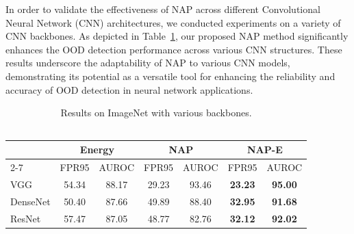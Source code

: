 In order to validate the effectiveness of NAP across different Convolutional Neural Network (CNN) architectures, we conducted experiments on a variety of CNN backbones. As depicted in Table~\ref{tab:backbones}, our proposed NAP method significantly enhances the OOD detection performance across various CNN structures.
These results underscore the adaptability of NAP to various CNN models, demonstrating its potential as a versatile tool for enhancing the reliability and accuracy of OOD detection in neural network applications. 
\begin{table}[!h]
\scriptsize
\centering
\caption{Results on ImageNet with various backbones.\\\quad\\}
\label{tab:backbones}
\begin{tabular}{@{}lcc|cc|cc@{}}
\toprule
             & \multicolumn{2}{c|}{Energy} & \multicolumn{2}{c|}{NAP} & \multicolumn{2}{c}{NAP-E} \\ \cmidrule(l){2-7} 
             & FPR95        & AUROC        & FPR95       & AUROC      & FPR95       & AUROC       \\ \midrule
VGG          & 54.34             & 88.17             &  29.23           & 93.46           & \textbf{23.23}            & \textbf{95.00}            \\
DenseNet      & 50.40             & 87.66             & 49.89            & 88.40           & \textbf{32.95}            & \textbf{91.68}            \\
ResNet    & 57.47             & 87.05             & 48.77            & 82.76           & \textbf{32.12}            & \textbf{92.02}            \\ \bottomrule
\end{tabular}
\end{table}
